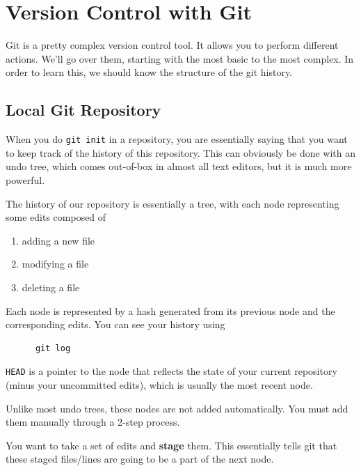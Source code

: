 \section{Version Control with Git} 

  Git is a pretty complex version control tool. It allows you to perform different actions. We'll go over them, starting with the most basic to the most complex. In order to learn this, we should know the structure of the git history. 

\subsection{Local Git Repository} 

  When you do \texttt{git init} in a repository, you are essentially saying that you want to keep track of the history of this repository. This can obviously be done with an undo tree, which comes out-of-box in almost all text editors, but it is much more powerful. 

  \begin{definition}
    The history of our repository is essentially a tree, with each node representing some edits composed of 
    \begin{enumerate}
      \item adding a new file 
      \item modifying a file 
      \item deleting a file
    \end{enumerate} 
    Each node is represented by a hash generated from its previous node and the corresponding edits. You can see your history using  
    \begin{lstlisting}
      git log 
    \end{lstlisting} 
    \texttt{HEAD} is a pointer to the node that reflects the state of your current repository (minus your uncommitted edits), which is usually the most recent node. 
  \end{definition} 

  Unlike most undo trees, these nodes are not added automatically. You must add them manually through a 2-step process. 

  \begin{definition}[Stage]
    You want to take a set of edits and \textbf{stage} them. This essentially tells git that these staged files/lines are going to be a part of the next node. 
  \end{definition}

